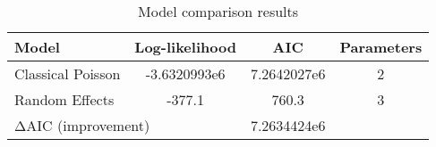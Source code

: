 \begin{table}[H]
\centering
\begin{tabular}{lccc}
\toprule
Model & Log-likelihood & AIC & Parameters \\
\midrule
Classical Poisson & -3.6320993e6 & 7.2642027e6 & 2 \\
Random Effects & -377.1 & 760.3 & 3 \\
\midrule
\multicolumn{2}{l}{ΔAIC (improvement)} & 7.2634424e6 & \\
\bottomrule
\end{tabular}
\caption{Model comparison results}
\label{tab:model_comparison}
\end{table}
